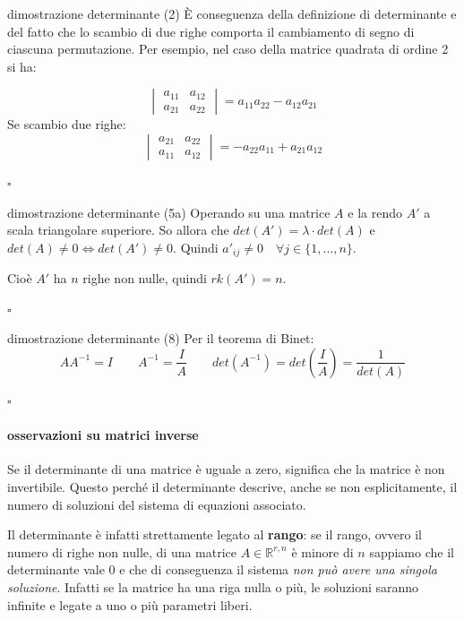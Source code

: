 \documentclass[x11names]{article}
\newcommand*{\QEDB}{\null\nobreak\hfill\ensuremath{\square}}%
\begin{document}
\begin{es}{dimostrazione determinante (2)}
È conseguenza della definizione di determinante e del fatto che lo scambio di due righe comporta il cambiamento di segno di ciascuna permutazione. Per esempio, nel caso della matrice quadrata di ordine 2 si ha:    

$$
\begin{vmatrix}
    a_{11} & a_{12} \\
    a_{21} & a_{22}
\end{vmatrix}
= a_{11}a_{22} - a_{12}a_{21}
$$
Se scambio due righe:
$$
\begin{vmatrix}
    a_{21} & a_{22} \\
    a_{11} & a_{12} 
\end{vmatrix}
= - a_{22}a_{11} + a_{21}a_{12}
$$

\QEDB
\end{es}
\begin{es}{dimostrazione determinante (5a)}
    Operando su una matrice $A$ e la rendo $A'$ a scala triangolare superiore. So allora che $det(A')=\lambda \cdot det(A)$ e $det(A) \neq 0 \Leftrightarrow det(A') \neq 0$.
    Quindi $a'_{ij} \neq 0 \quad \forall j \in \{1,\dots,n\}$.

    Cioè $A'$ ha $n$ righe non nulle, quindi $rk(A') = n$.

\QEDB
\end{es}
\begin{es}{dimostrazione determinante (8)} 
Per il teorema di Binet:
$$
AA^{-1} = I \qquad A^{-1} = \frac{I}{A} \qquad det(A^{-1}) = det\left(\frac{I}{A} \right)= \frac{1}{det(A)}
$$

\QEDB
\end{es}





\vspace{1em}
\noindent
\paragraph{osservazioni su matrici inverse}
Se il determinante di una matrice è uguale a zero, significa che la matrice è non invertibile. Questo perché il determinante descrive, anche se non esplicitamente, il numero di soluzioni del sistema di equazioni associato.

\noindent
Il determinante è infatti strettamente legato al \textbf{rango}: se il rango, ovvero il numero di righe non nulle, di una matrice $A \in \mathbb{R}^{r,n}$ è minore di $n$ sappiamo che il determinante vale $0$ e che di conseguenza il sistema\textit{ non può avere una singola soluzione}. Infatti se la matrice ha una riga nulla o più, le soluzioni saranno infinite e legate a uno o più parametri liberi.
\end{document}
